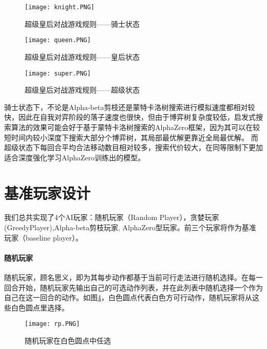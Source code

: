 \begin{figure}[H]
    \centering
    \texttt{[image: knight.PNG]}
    \caption[rules-knight]{%
        超级皇后对战游戏规则——骑士状态%
      }
    \label{fig:knight}
\end{figure}

\begin{figure}[H]
    \centering
    \texttt{[image: queen.PNG]}
    \caption[rules-queen]{%
        超级皇后对战游戏规则——皇后状态%
      }
    \label{fig:queen}
\end{figure}

\begin{figure}[H]
    \centering
    \texttt{[image: super.PNG]}
    \caption[rules-super]{%
        超级皇后对战游戏规则——超级状态%
      }
    \label{fig:super}
\end{figure}
骑士状态下，不论是Alpha-beta剪枝还是蒙特卡洛树搜索进行模拟速度都相对较快，因此在自我对弈阶段的落子速度也很快，但由于博弈树复杂度较低，启发式搜索算法的效果可能会好于基于蒙特卡洛树搜索的AlphaZero框架，因为其可以在较短时间内较小深度下搜索大部分个博弈树，其局部最优解更靠近全局最优解。
而超级状态下每回合平均合法移动数目相对较多，搜索代价较大，在同等限制下更加适合深度强化学习AlphaZero训练出的模型。

\section{基准玩家设计}
我们总共实现了4个AI玩家：随机玩家（Random Player），贪婪玩家(GreedyPlayer),Alpha-beta剪枝玩家, AlphaZero型玩家。前三个玩家将作为基准玩家（baseline player）。
\paragraph{随机玩家}
随机玩家，顾名思义，即为其每步动作都基于当前可行走法进行随机选择。在每一回合开始，随机玩家先输出自己的可选动作列表，并在此列表中随机选择一个作为自己在这一回合的动作。如图\ref{fig:super}，白色圆点代表白色方可行动作，随机玩家将从这些白色圆点里选择。
\begin{figure}[H]
    \centering
    \texttt{[image: rp.PNG]}
    \caption[rp]{%
        随机玩家在白色圆点中任选%
      }
    \label{fig:super}
\end{figure}

